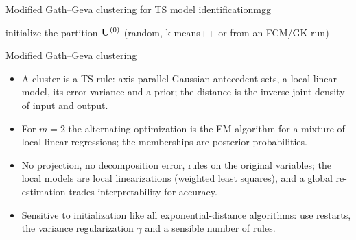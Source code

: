 \begin{algobox}{Modified Gath--Geva clustering for TS model identification}{mgg}
\begin{algorithm}[H]
initialize the partition $\mathbf{U}^{(0)}$ (random, k-means++ or from an FCM/GK run)\;
\end{algorithm}
\end{algobox}
\begin{summarybox}{Modified Gath--Geva clustering}
\begin{itemize}
  \item A cluster is a TS rule: axis-parallel Gaussian antecedent sets, a local linear model, its error variance and a prior; the distance is the inverse joint density of input and output.
  \item For $m=2$ the alternating optimization is the EM algorithm for a mixture of local linear regressions; the memberships are posterior probabilities.
  \item No projection, no decomposition error, rules on the original variables; the local models are local linearizations (weighted least squares), and a global re-estimation trades interpretability for accuracy.
  \item Sensitive to initialization like all exponential-distance algorithms: use restarts, the variance regularization $\gamma$ and a sensible number of rules.
\end{itemize}
\end{summarybox}

